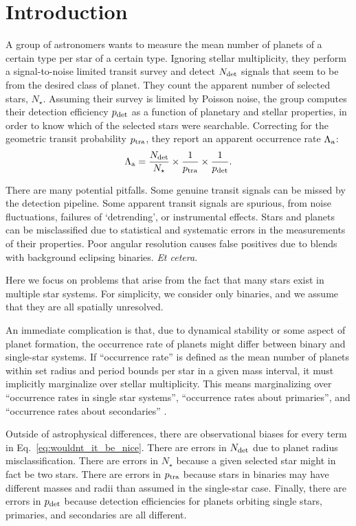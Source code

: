 \section{Introduction}

A group of astronomers wants to measure the mean number of planets of a 
certain type per star of a certain type.
Ignoring stellar multiplicity, they perform a signal-to-noise limited transit 
survey and detect $N_{\rm det}$ signals that seem to be from the desired 
class of planet.
They count the apparent number of selected stars, $N_\star$.
Assuming their survey is limited by Poisson noise, the group computes
their detection efficiency $p_{\rm det}$ as a function of planetary and 
stellar properties, in order to know which of the selected stars were
searchable.
Correcting for the geometric transit probability $p_{\rm tra}$, they report an 
apparent occurrence rate $\Lambda_{\rm a}$:
\begin{equation}
\Lambda_{\rm a} = \frac{N_{\rm det}}{N_\star} \times \frac{1}{p_{\rm tra}}
								  \times \frac{1}{p_{\rm det}}.
\label{eq:wouldnt_it_be_nice}
\end{equation}

There are many potential pitfalls.  Some genuine transit signals can be missed
by the detection pipeline.  Some apparent transit signals are spurious, from
noise fluctuations, failures of `detrending', or instrumental effects.  Stars
and planets can be misclassified due to statistical and systematic errors in
the measurements of their properties.  Poor angular resolution causes false
positives due to blends with background eclipsing binaries. {\it Et cetera}.

Here we focus on problems that arise from the fact that many stars exist in 
multiple star systems.
For simplicity, we consider only binaries, and we assume that they are all 
spatially unresolved.

An immediate complication is that, due to dynamical stability or some 
aspect of planet formation, the occurrence rate of planets might differ 
between binary and single-star systems.
If ``occurrence rate'' is defined as the mean number of planets within 
set radius and period bounds per star in a given mass interval, it must 
implicitly marginalize over stellar multiplicity.
This means marginalizing over ``occurrence rates in single star systems'', 
``occurrence rates about primaries'', and
``occurrence rates about secondaries''
\citep[see][]{wang_occurrence_2015}.

Outside of astrophysical differences, there are observational biases for every 
term in Eq.~\ref{eq:wouldnt_it_be_nice}.
There are errors in $N_{\rm det}$ due to planet radius misclassification.
There are errors in $N_\star$ because a given selected star might in fact be 
two stars.
There are errors in $p_{\rm tra}$ because stars in binaries may have different 
masses and radii than assumed in the single-star case.
Finally, there are errors in $p_{\rm det}$ because detection efficiencies 
for planets orbiting single stars, primaries, and secondaries are all 
different.

